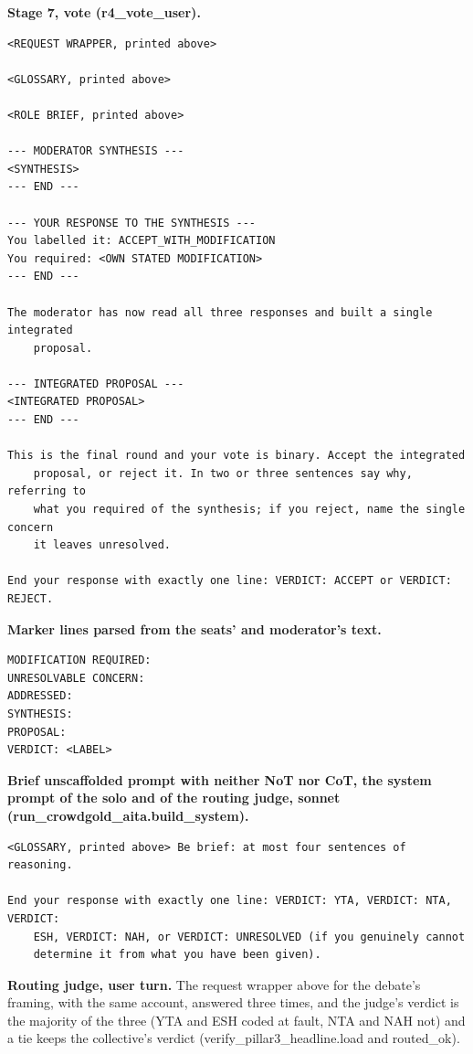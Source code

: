 \noindent\textbf{Stage 7, vote (r4\_vote\_user).}
\begin{verbatim}
<REQUEST WRAPPER, printed above>

<GLOSSARY, printed above>

<ROLE BRIEF, printed above>

--- MODERATOR SYNTHESIS ---
<SYNTHESIS>
--- END ---

--- YOUR RESPONSE TO THE SYNTHESIS ---
You labelled it: ACCEPT_WITH_MODIFICATION
You required: <OWN STATED MODIFICATION>
--- END ---

The moderator has now read all three responses and built a single integrated
    proposal.

--- INTEGRATED PROPOSAL ---
<INTEGRATED PROPOSAL>
--- END ---

This is the final round and your vote is binary. Accept the integrated
    proposal, or reject it. In two or three sentences say why, referring to
    what you required of the synthesis; if you reject, name the single concern
    it leaves unresolved.

End your response with exactly one line: VERDICT: ACCEPT or VERDICT: REJECT.
\end{verbatim}

\noindent\textbf{Marker lines parsed from the seats' and moderator's text.}
\begin{verbatim}
MODIFICATION REQUIRED:
UNRESOLVABLE CONCERN:
ADDRESSED:
SYNTHESIS:
PROPOSAL:
VERDICT: <LABEL>
\end{verbatim}

\noindent\textbf{Brief unscaffolded prompt with neither NoT nor CoT, the system prompt of the solo and of the routing judge, sonnet (run\_crowdgold\_aita.build\_system).}
\begin{verbatim}
<GLOSSARY, printed above> Be brief: at most four sentences of reasoning.

End your response with exactly one line: VERDICT: YTA, VERDICT: NTA, VERDICT:
    ESH, VERDICT: NAH, or VERDICT: UNRESOLVED (if you genuinely cannot
    determine it from what you have been given).
\end{verbatim}

\noindent\textbf{Routing judge, user turn.}
The request wrapper above for the debate's framing, with the same account, answered three times, and the judge's verdict is the majority of the three (YTA and ESH coded at fault, NTA and NAH not) and a tie keeps the collective's verdict (verify\_pillar3\_headline.load and routed\_ok).


